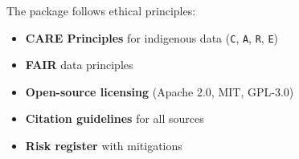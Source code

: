 The package follows ethical principles:

\begin{itemize}
    \item \textbf{CARE Principles} for indigenous data (\texttt{C}, \texttt{A}, \texttt{R}, \texttt{E})
    \item \textbf{FAIR} data principles
    \item \textbf{Open-source licensing} (Apache 2.0, MIT, GPL-3.0)
    \item \textbf{Citation guidelines} for all sources
    \item \textbf{Risk register} with mitigations
\end{itemize}
